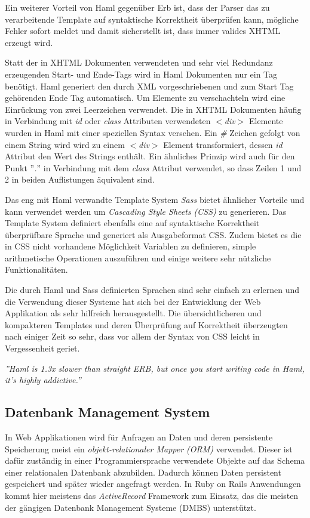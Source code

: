 Ein weiterer Vorteil von Haml gegenüber Erb ist, dass der Parser das
zu verarbeitende Template auf syntaktische Korrektheit überprüfen
kann, mögliche Fehler sofort meldet und damit sicherstellt ist, dass
immer valides XHTML erzeugt wird.

Statt der in XHTML Dokumenten verwendeten und sehr viel Redundanz
erzeugenden Start- und Ende-Tags wird in Haml Dokumenten nur ein Tag
benötigt. Haml generiert den durch XML vorgeschriebenen und zum Start
Tag gehörenden Ende Tag automatisch. Um Elemente zu verschachteln wird
eine Einrückung von zwei Leerzeichen verwendet. Die in XHTML
Dokumenten häufig in Verbindung mit \textit{id} oder \textit{class}
Attributen verwendeten \textit{$<$div$>$} Elemente wurden in Haml mit
einer speziellen Syntax versehen. Ein \textit{\#} Zeichen gefolgt von
einem String wird wird zu einem \textit{$<$div$>$} Element
transformiert, dessen \textit{id} Attribut den Wert des Strings
enthält. Ein ähnliches Prinzip wird auch für den Punkt ''\textit{.}''
in Verbindung mit dem \textit{class} Attribut verwendet, so dass
Zeilen 1 und 2 in beiden Auflistungen äquivalent sind.

Das eng mit Haml verwandte Template System \textit{Sass} bietet
ähnlicher Vorteile und kann verwendet werden um \textit{Cascading
  Style Sheets (CSS)} zu generieren. Das Template System definiert
ebenfalls eine auf syntaktische Korrektheit überprüfbare Sprache und
generiert als Ausgabeformat CSS. Zudem bietet es die in CSS nicht
vorhandene Möglichkeit Variablen zu definieren, simple arithmetische
Operationen auszuführen und einige weitere sehr nützliche
Funktionalitäten.

Die durch Haml und Sass definierten Sprachen sind sehr einfach zu
erlernen und die Verwendung dieser Systeme hat sich bei der
Entwicklung der Web Applikation als sehr hilfreich herausgestellt. Die
übersichtlicheren und kompakteren Templates und deren Überprüfung auf
Korrektheit überzeugten nach einiger Zeit so sehr, dass vor allem der
Syntax von CSS leicht in Vergessenheit geriet.

\textit{''Haml is 1.3x slower than straight ERB, but once you start
  writing code in Haml, it’s highly addictive.''}

\subsection{Datenbank Management System}

In Web Applikationen wird für Anfragen an Daten und deren persistente
Speicherung meist ein \textit{objekt-relationaler Mapper (ORM)}
verwendet. Dieser ist dafür zuständig in einer Programmiersprache
verwendete Objekte auf das Schema einer relationalen Datenbank
abzubilden. Dadurch können Daten persistent gespeichert und später
wieder angefragt werden. In Ruby on Rails Anwendungen kommt hier
meistens das \textit{ActiveRecord} Framework zum Einsatz, das die
meisten der gängigen Datenbank Management Systeme (DMBS) unterstützt.


